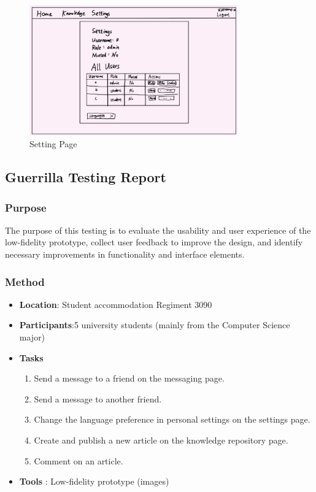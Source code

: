 \documentclass[12pt]{article}
\begin{document}
    \begin{figure}[H]
        \centering
        \includegraphics[width=0.8\textwidth]{graphs/setting_page.jpg}
        \caption{Setting Page}
        \label{Setting Page}
    \end{figure}



\subsection{Guerrilla Testing Report}

    \subsubsection*{Purpose} 
    The purpose of this testing is to evaluate the usability and user experience of the low-fidelity prototype, collect user feedback to improve the design, and identify necessary improvements in functionality and interface elements.

    \subsubsection*{Method}
        \begin{itemize}
            \item \textbf{Location}: Student accommodation Regiment 3090

            \item\textbf{Participants}:5 university students (mainly from the Computer Science major)

            \item \textbf{Tasks}
                \begin{enumerate}
                    \item Send a message to a friend on the messaging page.
                    \item Send a message to another friend.
                    \item Change the language preference in personal settings on the settings page.
                    \item Create and publish a new article on the knowledge repository page.
                    \item Comment on an article.
                \end{enumerate}

            \item \textbf{Tools} : Low-fidelity prototype (images)

        \end{itemize}
\end{document}
